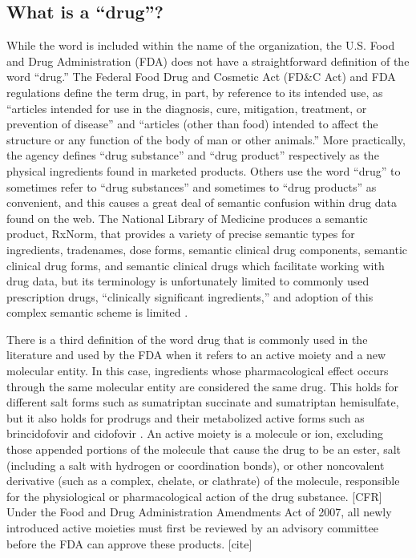 \documentclass{bioinfo}
\begin{document}
\subsection{What is a ``drug''?}
While the word is included within the name of the organization, the U.S. Food and Drug Administration (FDA) does not have a straightforward definition of the word ``drug.'' The Federal Food Drug and Cosmetic Act (FD\&C Act) and FDA regulations define the term drug, in part, by reference to its intended use, as ``articles intended for use in the diagnosis, cure, mitigation, treatment, or prevention of disease” and “articles (other than food) intended to affect the structure or any function of the body of man or other animals.'' \citep{FDADrug}
More practically, the agency defines ``drug substance'' and ``drug product'' respectively as the physical ingredients found in marketed products. Others use the word ``drug'' to sometimes refer to ``drug substances'' and sometimes to ``drug products'' as convenient, and this causes a great deal of semantic confusion within drug data found on the web. The National Library of Medicine produces a semantic product, RxNorm, that provides a variety of precise semantic types for ingredients, tradenames, dose forms, semantic clinical drug components, semantic clinical drug forms, and semantic clinical drugs which facilitate working with drug data, but its terminology is unfortunately limited to commonly used prescription drugs, ``clinically significant ingredients,'' and adoption of this complex semantic scheme is limited \citep{RxNorm}.

There is a third definition of the word drug that is commonly used in the literature and used by the FDA when it refers to an active moiety and a new molecular entity. In this case, ingredients whose pharmacological effect occurs through the same molecular entity are considered the same drug. This holds for different salt forms such as sumatriptan succinate and sumatriptan hemisulfate, but it also holds for prodrugs and their metabolized active forms such as brincidofovir and cidofovir \citep{NME}. An active moiety is a molecule or ion, excluding those appended portions of the molecule that cause the drug to be an ester, salt (including a salt with hydrogen or coordination bonds), or other noncovalent derivative (such as a complex, chelate, or clathrate) of the molecule, responsible for the physiological or pharmacological action of the drug substance. [CFR] Under the Food and Drug Administration Amendments Act of 2007, all newly introduced active moieties must first be reviewed by an advisory committee before the FDA can approve these products. [cite]
\end{document}

